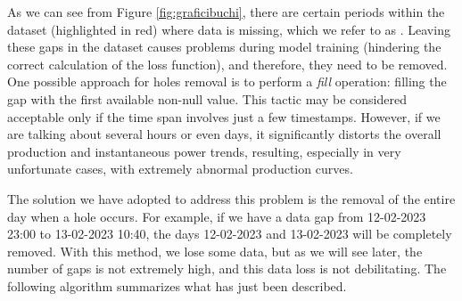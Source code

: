 As we can see from Figure \ref{fig:graficibuchi}, there are certain
periods within the dataset (highlighted in red) where data is missing,
which we refer to as . Leaving these gaps in the
dataset causes problems during model training
(hindering the correct calculation of the loss function), and therefore,
they need to be removed. One possible approach for holes removal
is to perform a \textit{fill} operation: filling the gap with the
first available non-null value. This tactic may be considered
acceptable only if the time span involves just a few timestamps.
However, if we are talking about several hours or even days, it
significantly distorts the overall production and instantaneous
power trends, resulting, especially in very unfortunate cases, with extremely abnormal production curves.

The solution we have adopted to address this problem is the removal of
the entire day when a hole occurs. For example, if we have a data
gap from 12-02-2023 23:00 to 13-02-2023 10:40, the days
12-02-2023 and 13-02-2023 will be completely removed. With this
method, we lose some data, but as we will see later, the number of
gaps is not extremely high, and this data loss is not
debilitating. The following algorithm summarizes what has
just been described.

